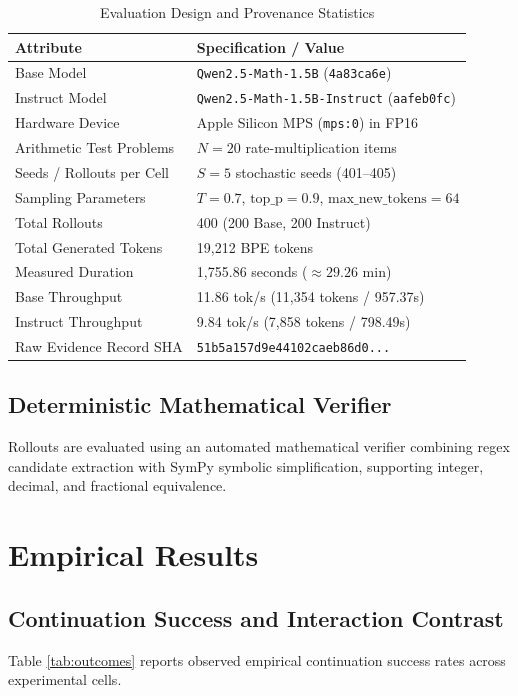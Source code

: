 \documentclass[conference]{IEEEtran}
\begin{document}
\begin{table}[htbp]
\caption{Evaluation Design and Provenance Statistics}
\label{tab:provenance}
\centering
\begin{tabularx}{\columnwidth}{Xl}
\toprule
\textbf{Attribute} & \textbf{Specification / Value} \\
\midrule
Base Model & \texttt{Qwen2.5-Math-1.5B} (\texttt{4a83ca6e}) \\
Instruct Model & \texttt{Qwen2.5-Math-1.5B-Instruct} (\texttt{aafeb0fc}) \\
Hardware Device & Apple Silicon MPS (\texttt{mps:0}) in FP16 \\
Arithmetic Test Problems & $N = 20$ rate-multiplication items \\
Seeds / Rollouts per Cell & $S = 5$ stochastic seeds (401--405) \\
Sampling Parameters & $T = 0.7$, $\text{top\_p} = 0.9$, $\text{max\_new\_tokens} = 64$ \\
Total Rollouts & 400 (200 Base, 200 Instruct) \\
Total Generated Tokens & 19,212 BPE tokens \\
Measured Duration & 1,755.86 seconds ($\approx 29.26$ min) \\
Base Throughput & 11.86 tok/s (11,354 tokens / 957.37s) \\
Instruct Throughput & 9.84 tok/s (7,858 tokens / 798.49s) \\
Raw Evidence Record SHA & \texttt{51b5a157d9e44102caeb86d0...} \\
\bottomrule
\end{tabularx}
\end{table}

\subsection{Deterministic Mathematical Verifier}
Rollouts are evaluated using an automated mathematical verifier combining regex candidate extraction with SymPy symbolic simplification, supporting integer, decimal, and fractional equivalence.

\section{Empirical Results}

\subsection{Continuation Success and Interaction Contrast}
Table \ref{tab:outcomes} reports observed empirical continuation success rates across experimental cells.
\end{document}
